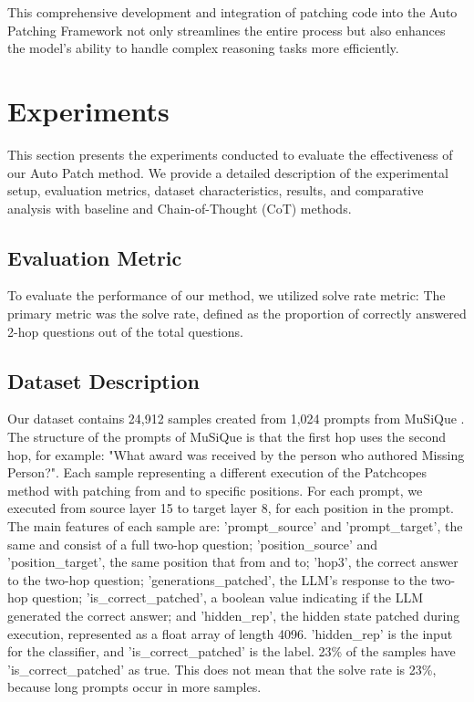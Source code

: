 \documentclass[11pt]{article}
\begin{document}
This comprehensive development and integration of patching code into the Auto Patching Framework not only streamlines the entire process but also enhances the model’s ability to handle complex reasoning tasks more efficiently.


\section{Experiments}

This section presents the experiments conducted to evaluate the effectiveness of our Auto Patch method. We provide a detailed description of the experimental setup, evaluation metrics, dataset characteristics, results, and comparative analysis with baseline and Chain-of-Thought (CoT) methods.

\subsection{Evaluation Metric}

To evaluate the performance of our method, we utilized solve rate metric:
The primary metric was the solve rate, defined as the proportion of correctly answered 2-hop questions out of the total questions.

\subsection{Dataset Description}
Our dataset contains 24,912 samples created from 1,024 prompts from MuSiQue \cite{deldjoo2021musique}. The structure of the prompts of MuSiQue is that the first hop uses the second hop, for example: "What award was received by the person who authored Missing Person?". Each sample representing a different execution of the Patchcopes method with patching from and to specific positions. For each prompt, we executed from source layer 15 to target layer 8, for each position in the prompt. The main features of each sample are: 'prompt\_source' and 'prompt\_target', the same and consist of a full two-hop question; 'position\_source' and 'position\_target', the same position that from and to; 'hop3', the correct answer to the two-hop question; 'generations\_patched', the LLM's response to the two-hop question; 'is\_correct\_patched', a boolean value indicating if the LLM generated the correct answer; and 'hidden\_rep', the hidden state patched during execution, represented as a float array of length 4096. 'hidden\_rep' is the input for the classifier, and 'is\_correct\_patched' is the label.
23\% of the samples have 'is\_correct\_patched' as true. This does not mean that the solve rate is 23\%, because long prompts occur in more samples.
\end{document}
